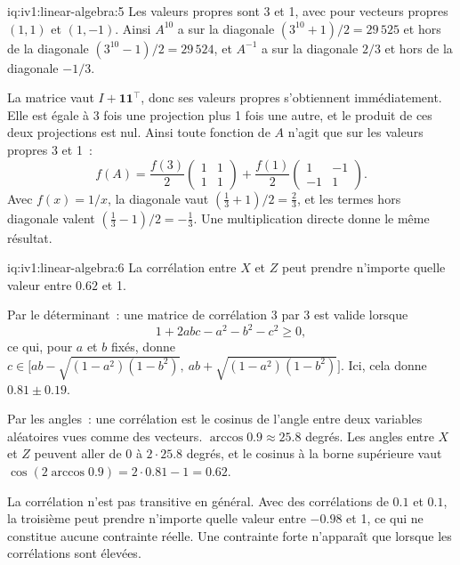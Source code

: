 \begin{solution}{iq:iv1:linear-algebra:5}
Les valeurs propres sont 3 et 1, avec pour vecteurs propres $(1, 1)$ et $(1, -1)$. Ainsi $A^{10}$ a sur la diagonale $(3^{10} + 1)/2 = 29\,525$ et hors de la diagonale $(3^{10} - 1)/2 = 29\,524$, et $A^{-1}$ a sur la diagonale $2/3$ et hors de la diagonale $-1/3$.

La matrice vaut $I + \mathbf{1}\mathbf{1}^\top$, donc ses valeurs propres s'obtiennent immédiatement. Elle est égale à 3 fois une projection plus 1 fois une autre, et le produit de ces deux projections est nul. Ainsi toute fonction de $A$ n'agit que sur les valeurs propres 3 et 1~:
\[
f(A) = \frac{f(3)}{2}\begin{pmatrix}1&1\\1&1\end{pmatrix} + \frac{f(1)}{2}\begin{pmatrix}1&-1\\-1&1\end{pmatrix}.
\]
Avec $f(x) = 1/x$, la diagonale vaut $(\tfrac13 + 1)/2 = \tfrac23$, et les termes hors diagonale valent $(\tfrac13 - 1)/2 = -\tfrac13$. Une multiplication directe donne le même résultat.

\end{solution}

\begin{solution}{iq:iv1:linear-algebra:6}
La corrélation entre $X$ et $Z$ peut prendre n'importe quelle valeur entre $0.62$ et 1.

Par le déterminant~: une matrice de corrélation 3 par 3 est valide lorsque
\[
1 + 2abc - a^2 - b^2 - c^2 \ge 0,
\]
ce qui, pour $a$ et $b$ fixés, donne $c \in \bigl[ab - \sqrt{(1 - a^2)(1 - b^2)},\ ab + \sqrt{(1 - a^2)(1 - b^2)}\bigr]$. Ici, cela donne $0.81 \pm 0.19$.

Par les angles~: une corrélation est le cosinus de l'angle entre deux variables aléatoires vues comme des vecteurs. $\arccos 0.9 \approx 25.8$ degrés. Les angles entre $X$ et $Z$ peuvent aller de 0 à $2 \cdot 25.8$ degrés, et le cosinus à la borne supérieure vaut $\cos(2\arccos 0.9) = 2 \cdot 0.81 - 1 = 0.62$.

La corrélation n'est pas transitive en général. Avec des corrélations de $0.1$ et $0.1$, la troisième peut prendre n'importe quelle valeur entre $-0.98$ et 1, ce qui ne constitue aucune contrainte réelle. Une contrainte forte n'apparaît que lorsque les corrélations sont élevées.

\end{solution}

